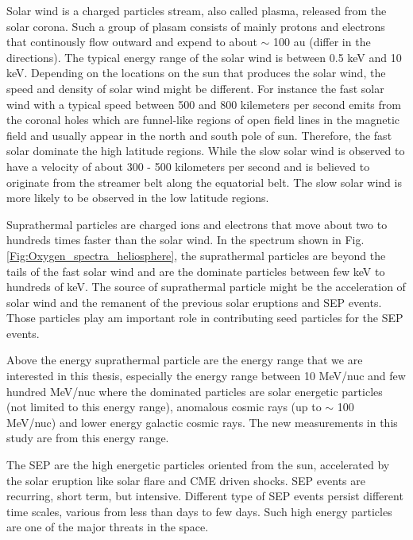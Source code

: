 Solar wind is a charged particles stream, also called plasma, released from the solar corona. Such a group of plasam consists of mainly protons and electrons that continously flow outward and expend to about $\sim$ 100 au (differ in the directions). The typical energy range of the solar wind is between 0.5 keV and 10 keV. Depending on the locations on the sun that produces the solar wind, the speed and density of solar wind might be different. For instance the fast solar wind with a typical speed between 500 and 800 kilemeters per second emits from the coronal holes which are funnel-like regions of open field lines in the magnetic field and usually appear in the north and south pole of sun. Therefore, the fast solar dominate the high latitude regions. While the slow solar wind is observed to have a velocity of about 300 - 500 kilometers per second and is believed to originate from the streamer belt along the equatorial belt. The slow solar wind is more likely to be observed in the low latitude regions.


Suprathermal particles are charged ions and electrons that move about two to hundreds times faster than the solar wind. In the spectrum shown in Fig.\ref{Fig:Oxygen_spectra_heliosphere}, the suprathermal particles are beyond the tails of the fast solar wind and are the dominate particles between few keV to hundreds of keV. The source of suprathermal particle might be the acceleration of solar wind and the remanent of the previous solar eruptions and \ac{SEP} events. Those particles play am important role in contributing seed particles for the \acl{SEP}	events.

Above the energy suprathermal particle are the energy range that we are interested in this thesis, especially the energy range between 10 MeV/nuc and few hundred MeV/nuc where the dominated particles are solar energetic particles (not limited to this energy range), anomalous cosmic rays (up to $\sim$ 100 MeV/nuc) and lower energy galactic cosmic rays. The new measurements in this study are from this energy range.

The \acl{SEP} are the high energetic particles oriented from the sun, accelerated by the solar eruption like solar flare and \ac{CME} driven shocks. \acs{SEP} events are recurring, short term, but intensive. Different type of \acs{SEP} events persist different time scales, various from less than days to few days. Such high energy particles are one of the major threats in the space.

